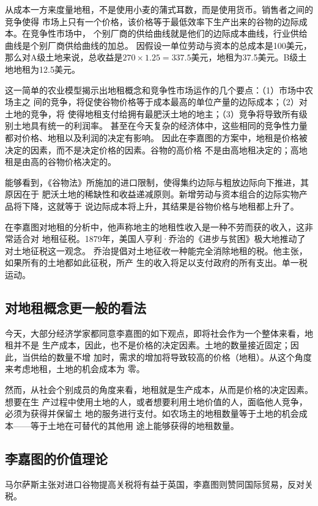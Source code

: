 从成本一方来度量地租，不是使用小麦的蒲式耳数，而是使用货币。销售者之间的竞争使得
市场上只有一个价格，该价格等于最低效率下生产出来的谷物的边际成本。在竞争性市场中，
个别厂商的供给曲线就是他们的边际成本曲线，行业供给曲线是个别厂商供给曲线的加总。
因假设一单位劳动与资本的总成本是100美元，那么对A级土地来说，总收益是$270 \times
1.25 = 337.5$美元，地租为37.5美元。B级土地地租为12.5美元。

这一简单的农业模型揭示出地租概念和竞争性市场运作的几个要点：（1）市场中农场主之
间的竞争，将促使谷物价格等于成本最高的单位产量的边际成本；（2）对土地的竞争，将
使得地租支付给拥有最肥沃土地的地主；（3）竞争将导致所有级别土地具有统一的利润率。
甚至在今天复杂的经济体中，这些相同的竞争性力量都对价格、地租以及利润的决定有影响。
因此在李嘉图的方案中，地租是价格被决定的因素，而不是决定价格的因素。谷物的高价格
不是由高地租决定的；高地租是由高的谷物价格决定的。

能够看到，《谷物法》所施加的进口限制，使得集约边际与粗放边际向下推进，其原因在于
肥沃土地的稀缺性和收益递减原则。新增劳动与资本组合的边际实物产品将下降，这就等于
说边际成本将上升，其结果是谷物价格与地租都上升了。

在李嘉图对地租的分析中，他声称地主的地租性收入是一种不劳而获的收入，这非常适合对
地租征税。1879年，美国人亨利·乔治的《进步与贫困》极大地推动了对土地征税这一观念。
乔治提倡对土地征收一种能完全消除地租的税。他主张，如果所有的土地都如此征税，所产
生的收入将足以支付政府的所有支出。单一税运动。

\subsection{对地租概念更一般的看法}

今天，大部分经济学家都同意李嘉图的如下观点，即将社会作为一个整体来看，地租并不是
生产成本，因此，也不是价格的决定因素。土地的数量接近固定；因此，当供给的数量不增
加时，需求的增加将导致较高的价格（地租）。从这个角度来考虑地租，土地的机会成本为
零。

然而，从社会个别成员的角度来看，地租就是生产成本，从而是价格的决定因素。想要在生
产过程中使用土地的人，或者想要利用土地价值的人，面临他人竞争，必须为获得并保留土
地的服务进行支付。如农场主的地租数量等于土地的机会成本——等于土地在可替代的其他用
途上能够获得的地租数量。

\subsection{李嘉图的价值理论}

马尔萨斯主张对进口谷物提高关税将有益于英国，李嘉图则赞同国际贸易，反对关税。


